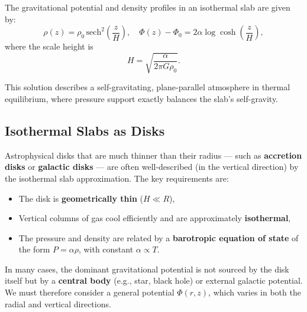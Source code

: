 \begin{tcolorbox}[colback=blue!5!white,colframe=blue!75!black,title=Isothermal Slab Solution]
The gravitational potential and density profiles in an isothermal slab are given by:
\begin{equation}
    \label{eq:isothermal_slab}
\rho(z) = \rho_0 \, \mathrm{sech}^2 \left( \frac{z}{H} \right), \quad
\Phi(z) - \Phi_0 = 2\alpha \log \cosh\left(\frac{z}{H}\right),
\end{equation}
where the scale height is
\[
\boxed{
H = \sqrt{\frac{\alpha}{2\pi G \rho_0}}.
}
\]
\end{tcolorbox}

This solution describes a self-gravitating, plane-parallel atmosphere in thermal equilibrium, where pressure support exactly balances the slab’s self-gravity.

\subsection{Isothermal Slabs as Disks}

Astrophysical disks that are much thinner than their radius — such as \textbf{accretion disks} or \textbf{galactic disks} — are often well-described (in the vertical direction) by the isothermal slab approximation. The key requirements are:
\begin{itemize}
    \item The disk is \textbf{geometrically thin} ($H \ll R$),
    \item Vertical columns of gas cool efficiently and are approximately \textbf{isothermal},
    \item The pressure and density are related by a \textbf{barotropic equation of state} of the form \( P = \alpha \rho \), with constant \( \alpha \propto T \).
\end{itemize}

In many cases, the dominant gravitational potential is not sourced by the disk itself but by a \textbf{central body} (e.g., star, black hole) or external galactic potential. We must therefore consider a general potential \( \Phi(r,z) \), which varies in both the radial and vertical directions.

